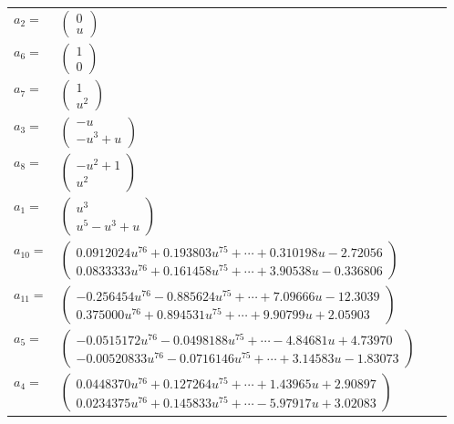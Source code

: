 \documentclass[1p]{elsarticle_modified}
\theoremstyle{definition}
\begin{document}
\begin{tabular}{m{7pt} m{180pt} m{7pt} m{180pt} }
\flushright $a_{2}=$&$\begin{pmatrix}0\\u\end{pmatrix}$ \\
\flushright $a_{6}=$&$\begin{pmatrix}1\\0\end{pmatrix}$ \\
\flushright $a_{7}=$&$\begin{pmatrix}1\\u^2\end{pmatrix}$ \\
\flushright $a_{3}=$&$\begin{pmatrix}- u\\- u^3+u\end{pmatrix}$ \\
\flushright $a_{8}=$&$\begin{pmatrix}- u^2+1\\u^2\end{pmatrix}$ \\
\flushright $a_{1}=$&$\begin{pmatrix}u^3\\u^5- u^3+u\end{pmatrix}$ \\
\flushright $a_{10}=$&$\begin{pmatrix}0.0912024 u^{76}+0.193803 u^{75}+\cdots+0.310198 u-2.72056\\0.0833333 u^{76}+0.161458 u^{75}+\cdots+3.90538 u-0.336806\end{pmatrix}$ \\
\flushright $a_{11}=$&$\begin{pmatrix}-0.256454 u^{76}-0.885624 u^{75}+\cdots+7.09666 u-12.3039\\0.375000 u^{76}+0.894531 u^{75}+\cdots+9.90799 u+2.05903\end{pmatrix}$ \\
\flushright $a_{5}=$&$\begin{pmatrix}-0.0515172 u^{76}-0.0498188 u^{75}+\cdots-4.84681 u+4.73970\\-0.00520833 u^{76}-0.0716146 u^{75}+\cdots+3.14583 u-1.83073\end{pmatrix}$ \\
\flushright $a_{4}=$&$\begin{pmatrix}0.0448370 u^{76}+0.127264 u^{75}+\cdots+1.43965 u+2.90897\\0.0234375 u^{76}+0.145833 u^{75}+\cdots-5.97917 u+3.02083\end{pmatrix}$ \\

\end{tabular}
\end{document}
